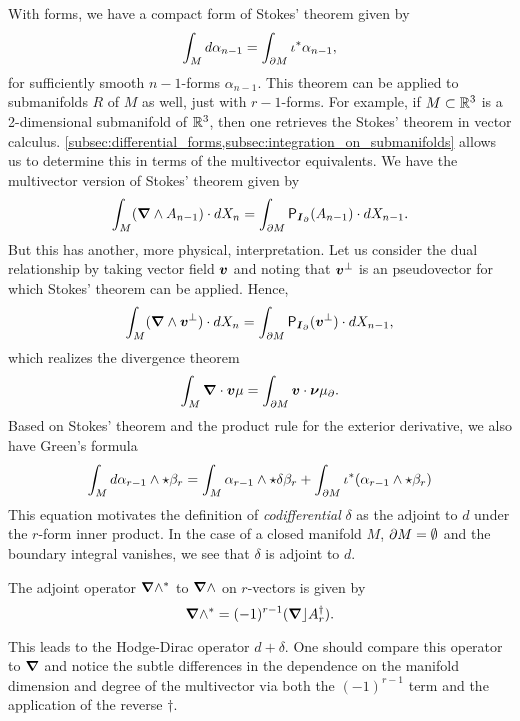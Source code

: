 With forms, we have a compact form of Stokes' theorem given by
\begin{equation}
\int_M d \alpha_{n-1} = \int_{{\partial M}} \iota^* \alpha_{n-1},
\end{equation}
for sufficiently smooth $n-1$-forms $\alpha_{n-1}$. This theorem can be applied to submanifolds $R$ of $M$ as well, just with $r-1$-forms. For example, if $M\subset \mathbb{R}^3$ is a 2-dimensional submanifold of $\mathbb{R}^3$, then one retrieves the Stokes' theorem in vector calculus. \cref{subsec:differential_forms,subsec:integration_on_submanifolds} allows us to determine this in terms of the multivector equivalents. We have the multivector version of Stokes' theorem given by
\begin{equation}
\label{eq:stokes_theorem}
\int_M (\boldsymbol{\nabla} \wedge A_{n-1})\cdot dX_n = \int_{\partial M} \mathsf{P}_{\boldsymbol{I}_\partial}(A_{n-1}) \cdot dX_{n-1}.
\end{equation}
But this has another, more physical, interpretation. Let us consider the dual relationship by taking vector field $\boldsymbol{v}$ and noting that $\boldsymbol{v}^\perp$ is an pseudovector for which Stokes' theorem can be applied. Hence,
\begin{equation}
\label{eq:stokes_theorem_dual}
\int_M (\boldsymbol{\nabla} \wedge \boldsymbol{v}^\perp) \cdot dX_n = \int_{\partial M} \mathsf{P}_{\boldsymbol{I}_\partial}(\boldsymbol{v}^\perp) \cdot dX_{n-1},
\end{equation}
which realizes the divergence theorem
\begin{equation}
\int_M \boldsymbol{\nabla} \cdot \boldsymbol{v} \mu = \int_{\partial M} \boldsymbol{v}\cdot \boldsymbol{\nu} \mu_\partial.
\end{equation}
Based on Stokes' theorem and the product rule for the exterior derivative, we also have Green's formula
\begin{equation}
\int_M d\alpha_{r-1} \wedge \star \beta_r = \int_M \alpha_{r-1} \wedge \star \delta \beta_r + \int_{{\partial M}} \iota^* (\alpha_{r-1} \wedge \star \beta_r)
\end{equation}
This equation motivates the definition of \emph{codifferential} $\delta$ as the adjoint to $d$ under the $r$-form inner product. In the case of a closed manifold $M$, ${\partial M} = \emptyset$ and the boundary integral vanishes, we see that $\delta$ is adjoint to $d$.

\begin{definition}
The adjoint operator $\boldsymbol{\nabla} \wedge^*$ to $\boldsymbol{\nabla} \wedge$ on $r$-vectors is given by
\begin{equation}
\boldsymbol{\nabla} \wedge^* = (-1)^{r-1} (\boldsymbol{\nabla} \rfloor A_r^\dagger).
\end{equation}
\end{definition}
This leads to the Hodge-Dirac operator $d+\delta$. One should compare this operator to $\boldsymbol{\nabla}$ and notice the subtle differences in the dependence on the manifold dimension and degree of the multivector via both the $(-1)^{r-1}$ term and the application of the reverse $\dagger$.

